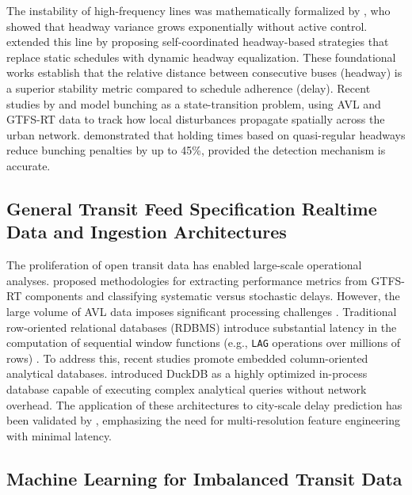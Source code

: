 \documentclass[fleqn,10pt,lineno]{wlpeerj}
\begin{document}
The instability of high-frequency lines was mathematically formalized by \citet{1}, who showed
that headway variance grows exponentially without active control. \citet{2} extended this line
by proposing self-coordinated headway-based strategies that replace static schedules with
dynamic headway equalization. These foundational works establish that the relative distance between
consecutive buses (headway) is a superior stability metric compared to schedule adherence
(delay). Recent studies by \citet{3} and \citet{8} model bunching as a state-transition
problem, using AVL and GTFS-RT data to track how local disturbances propagate spatially across
the urban network. \citet{10} demonstrated that holding times based on quasi-regular headways
reduce bunching penalties by up to 45\%, provided the detection mechanism is accurate.

\subsection{General Transit Feed Specification Realtime Data and Ingestion Architectures}

The proliferation of open transit data has enabled large-scale operational analyses.
\citet{11} proposed methodologies for extracting performance metrics from GTFS-RT components and
classifying systematic versus stochastic delays. However, the large volume of AVL data imposes
significant processing challenges \citep{12}. Traditional row-oriented relational databases
(RDBMS) introduce substantial latency in the computation of sequential window functions (e.g.,
\texttt{LAG} operations over millions of rows) \citep{13}. To address this, recent studies
promote embedded column-oriented analytical databases. \citet{14} introduced DuckDB as a highly
optimized in-process database capable of executing complex analytical queries without network
overhead. The application of these architectures to city-scale delay prediction has been
validated by \citet{15}, emphasizing the need for multi-resolution feature engineering with
minimal latency.

\subsection{Machine Learning for Imbalanced Transit Data}
\end{document}

